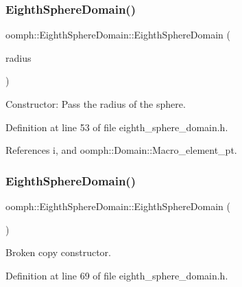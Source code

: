 \subsubsection{\texorpdfstring{Eighth\+Sphere\+Domain()}{EighthSphereDomain()}\hspace{0.1cm}{\footnotesize\ttfamily [1/2]}}
{\footnotesize\ttfamily oomph\+::\+Eighth\+Sphere\+Domain\+::\+Eighth\+Sphere\+Domain (\begin{DoxyParamCaption}\item[{const double \&}]{radius }\end{DoxyParamCaption})\hspace{0.3cm}{\ttfamily [inline]}}



Constructor\+: Pass the radius of the sphere. 



Definition at line 53 of file eighth\+\_\+sphere\+\_\+domain.\+h.



References i, and oomph\+::\+Domain\+::\+Macro\+\_\+element\+\_\+pt.

\mbox{\label{classoomph_1_1EighthSphereDomain_af831fd06346e57808dca43940385e970}} 
\subsubsection{\texorpdfstring{Eighth\+Sphere\+Domain()}{EighthSphereDomain()}\hspace{0.1cm}{\footnotesize\ttfamily [2/2]}}
{\footnotesize\ttfamily oomph\+::\+Eighth\+Sphere\+Domain\+::\+Eighth\+Sphere\+Domain (\begin{DoxyParamCaption}\item[{const \hyperlink{classoomph_1_1EighthSphereDomain}{Eighth\+Sphere\+Domain} \&}]{ }\end{DoxyParamCaption})\hspace{0.3cm}{\ttfamily [inline]}}



Broken copy constructor. 



Definition at line 69 of file eighth\+\_\+sphere\+\_\+domain.\+h.



